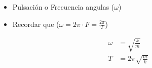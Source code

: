    \begin{itemize}
        \item Pulsación o Frecuencia angulas ($\omega$)
        \item Recordar que ($\omega = 2\pi \cdot F = \frac{2\pi}{T}$)
    \end{itemize}
    \begin{equation}
    \begin{split}
        \omega &= \sqrt{\frac{k}{m}}\\
        T &= 2\pi \sqrt{\frac{m}{k}}
    \end{split}    
    \end{equation}
